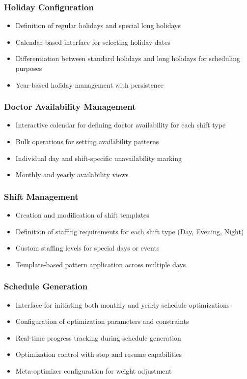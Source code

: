 \documentclass[12pt]{article}
\begin{document}
\subsubsection{Holiday Configuration}
\begin{itemize}
    \item Definition of regular holidays and special long holidays
    \item Calendar-based interface for selecting holiday dates
    \item Differentiation between standard holidays and long holidays for scheduling purposes
    \item Year-based holiday management with persistence
\end{itemize}

\subsubsection{Doctor Availability Management}
\begin{itemize}
    \item Interactive calendar for defining doctor availability for each shift type
    \item Bulk operations for setting availability patterns
    \item Individual day and shift-specific unavailability marking
    \item Monthly and yearly availability views
\end{itemize}

\subsubsection{Shift Management}
\begin{itemize}
    \item Creation and modification of shift templates
    \item Definition of staffing requirements for each shift type (Day, Evening, Night)
    \item Custom staffing levels for special days or events
    \item Template-based pattern application across multiple days
\end{itemize}

\subsubsection{Schedule Generation}
\begin{itemize}
    \item Interface for initiating both monthly and yearly schedule optimizations
    \item Configuration of optimization parameters and constraints
    \item Real-time progress tracking during schedule generation
    \item Optimization control with stop and resume capabilities
    \item Meta-optimizer configuration for weight adjustment
\end{itemize}
\end{document}
